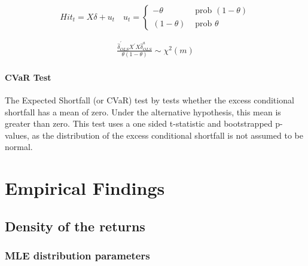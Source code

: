 \documentclass[a4paper, nobind]{templates/ociamthesis}
\begin{document}
\[Hit_{t}=X \delta+u_{t} \quad u_{t}=\left\{\begin{array}{ll}
-\theta & \text { prob }(1-\theta) \\
(1-\theta) & \text { prob } \theta
\end{array}\right.\]

\begin{align}
\frac{\hat{\delta}_{O L S}^{\prime} X^{\prime} X \hat{\delta}_{O L S}^{a}}{\theta(1-\theta)} \sim \chi^{2}(m)
\label{eq:dq3}
\end{align}

\hypertarget{cvar-test}{%
\subsubsection{CVaR Test}\label{cvar-test}}

The Expected Shortfall (or CVaR) test by \textcite{mcneil2000} tests whether the excess conditional shortfall has a mean of zero. Under the alternative hypothesis, this mean is greater than zero. This test uses a one sided t-statistic and bootstrapped p-values, as the distribution of the excess conditional shortfall is not assumed to be normal.

\hypertarget{analysis}{%
\chapter{Empirical Findings}\label{analysis}}

\minitoc 

\hypertarget{density-of-the-returns}{%
\section{Density of the returns}\label{density-of-the-returns}}

\hypertarget{mle-distribution-parameters}{%
\subsection{MLE distribution parameters}\label{mle-distribution-parameters}}
\end{document}
